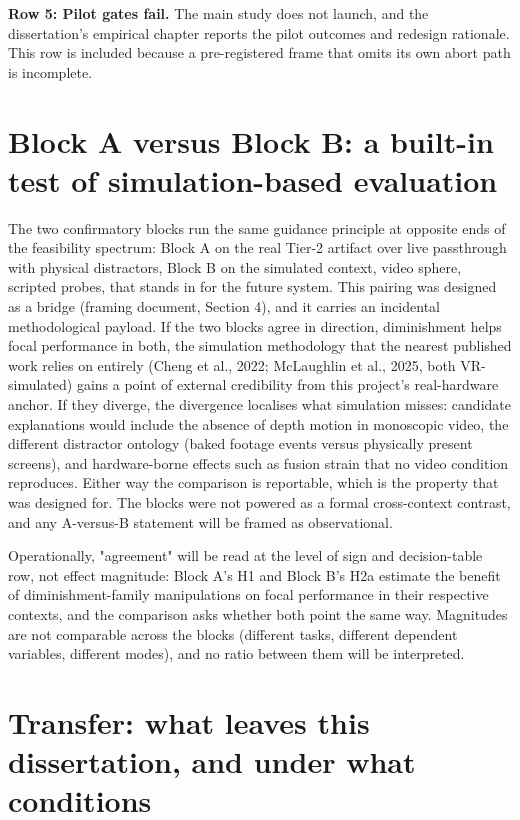 \textbf{Row 5: Pilot gates fail.} The main study does not launch, and the dissertation's empirical
chapter reports the pilot outcomes and redesign rationale. This row is included because a
pre-registered frame that omits its own abort path is incomplete.

\section{Block A versus Block B: a built-in test of simulation-based evaluation}

The two confirmatory blocks run the same guidance principle at opposite ends of the feasibility
spectrum: Block A on the real Tier-2 artifact over live passthrough with physical distractors,
Block B on the simulated context, video sphere, scripted probes, that stands in for the
future system. This pairing was designed as a bridge (framing document, Section 4), and it carries
an incidental methodological payload. If the two blocks agree in direction, diminishment helps
focal performance in both, the simulation methodology that the nearest published work relies on
entirely (Cheng et al., 2022; McLaughlin et al., 2025, both VR-simulated) gains a point of external
credibility from this project's real-hardware anchor. If they diverge, the divergence localises
what simulation misses: candidate explanations would include the absence of depth motion in
monoscopic video, the different distractor ontology (baked footage events versus physically present
screens), and hardware-borne effects such as fusion strain that no video condition reproduces.
Either way the comparison is reportable, which is the property that was designed for. The blocks
were not powered as a formal cross-context contrast, and any A-versus-B statement will be framed as
observational.

Operationally, "agreement" will be read at the level of sign and decision-table row, not effect
magnitude: Block A's H1 and Block B's H2a estimate the benefit of diminishment-family manipulations
on focal performance in their respective contexts, and the comparison asks whether both point the
same way. Magnitudes are not comparable across the blocks (different tasks, different dependent
variables, different modes), and no ratio between them will be interpreted.

\section{Transfer: what leaves this dissertation, and under what conditions}

